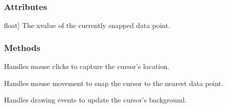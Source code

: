 \documentclass[letterpaper,10pt,english]{sphinxmanual}
\begin{document}
\begin{fulllineitems}
\begin{description}
\end{description}


\subsubsection{Attributes}
\label{\detokenize{pycatch/utils/plot:attributes}}\begin{description}
\sphinxlineitem{location}{[}float{]}
\sphinxAtStartPar
The x\sphinxhyphen{}value of the currently snapped data point.

\end{description}


\subsubsection{Methods}
\label{\detokenize{pycatch/utils/plot:methods}}\begin{description}
\sphinxAtStartPar
Handles mouse clicks to capture the cursor’s location.

\sphinxAtStartPar
Handles mouse movement to snap the cursor to the nearest data point.

\sphinxAtStartPar
Handles drawing events to update the cursor’s background.

\end{description}

\end{fulllineitems}

\end{document}
